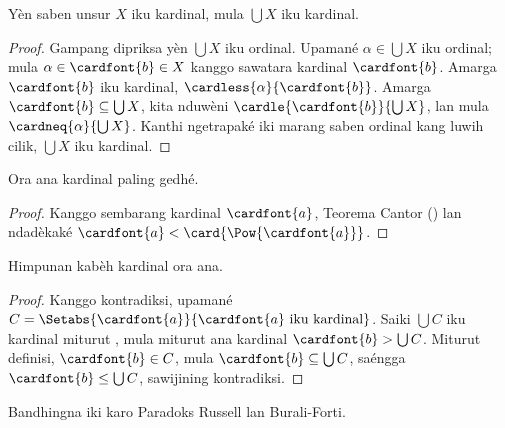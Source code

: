 \documentclass[../../../include/open-logic-section]{subfiles}
\begin{document}
\begin{prop}
Yèn saben unsur $X$ iku kardinal, mula $\bigcup X$ iku kardinal.
\end{prop}

\begin{proof}
Gampang dipriksa yèn $\bigcup X$ iku ordinal. Upamané $\alpha \in
\bigcup X$ iku ordinal; mula $\alpha \in \cardfont{b} \in X$ kanggo
sawatara kardinal $\cardfont{b}$. Amarga $\cardfont{b}$ iku kardinal,
$\cardless{\alpha}{\cardfont{b}}$. Amarga $\cardfont{b} \subseteq
\bigcup X$, kita nduwèni $\cardle{\cardfont{b}}{\bigcup X}$, lan mula
$\cardneq{\alpha}{\bigcup X}$. Kanthi ngetrapaké iki marang saben ordinal kang luwih cilik, $\bigcup X$
iku kardinal.
\end{proof}

\begin{thm}
Ora ana kardinal paling gedhé.
\end{thm}

\begin{proof}
Kanggo sembarang kardinal $\cardfont{a}$, Teorema Cantor
() lan
 ndadèkaké
$\cardfont{a} < \card{\Pow{\cardfont{a}}}$.
\end{proof}

\begin{thm}
Himpunan kabèh kardinal ora ana.
\end{thm}

\begin{proof}
Kanggo kontradiksi, upamané $C = \Setabs{\cardfont{a}}{\cardfont{a} \text{
iku kardinal}}$. Saiki $\bigcup C$ iku kardinal miturut
, mula miturut 
ana kardinal $\cardfont{b} > \bigcup C$. Miturut definisi,
$\cardfont{b} \in C$, mula $\cardfont{b} \subseteq \bigcup{C}$, saéngga
$\cardfont{b} \leq \bigcup C$, sawijining kontradiksi.
\end{proof}

Bandhingna iki karo Paradoks Russell lan Burali-Forti.
\end{document}
